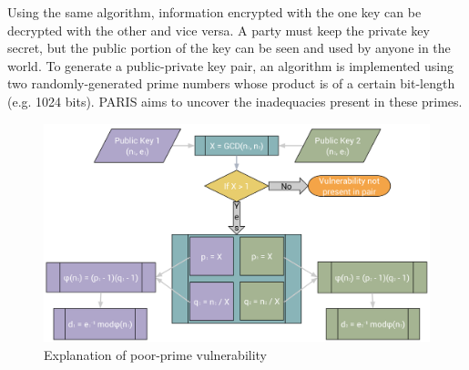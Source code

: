 \documentclass[smallextended]{svjour3}       %
\begin{document}
Using the same algorithm, information encrypted with the one key can be
decrypted with the other and vice versa. A party must keep the private key
secret, but the public portion of the key can be seen and used by anyone in the
world. To generate a public-private key pair, an algorithm is implemented using
two randomly-generated prime numbers whose product is of a certain bit-length
(e.g. 1024 bits). PARIS aims to uncover the inadequacies present in these
primes.


\begin{figure}
   \centering
   \includegraphics[width=\textwidth]{vulnerability}
   \caption{Explanation of poor-prime vulnerability}
   \label{fig:vuln}
\end{figure}

\end{document}
